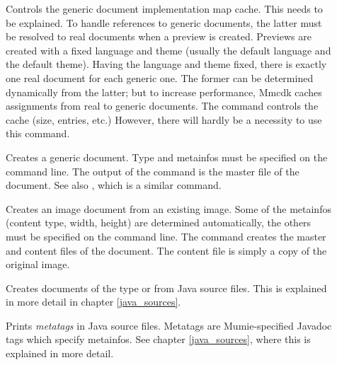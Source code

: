 \documentclass{generic}
\begin{document}
\begin{description}
\item[]

  Controls the generic document implementation map cache. This needs to be
  explained. To handle references to generic documents, the latter must be
  resolved to real documents when a preview is created. Previews are created
  with a fixed language and theme (usually the default language and the default
  theme). Having the language and theme fixed, there is exactly one real
  document for each generic one. The former can be determined dynamically from
  the latter; but to increase performance, Mmcdk caches assignments from real to
  generic documents. The  command controls the cache (size,
  entries, etc.) However, there will hardly be a necessity to use this command.

\item[]

  Creates a generic document. Type and metainfos must be specified on the
  command line. The output of the command is the master file of the
  document. See also , which is a similar command.

\item[]

  Creates an image document from an existing image. Some of the metainfos
  (content type, width, height) are determined automatically, the others must
  be specified on the command line. The command creates the master and content
  files of the document. The content file is simply a copy of the original
  image.

\item[]

  Creates documents of the type  or  from Java
  source files. This is explained in more detail in chapter \ref{java_sources}.

\item[]

  Prints \emph{metatags} in Java source files. Metatags are Mumie-specified
  Javadoc tags which specify metainfos. See chapter \ref{java_sources}, where
  this is explained in more detail.

\item[]

\item[]

\item[]

\item[]


\end{description}
\end{document}
